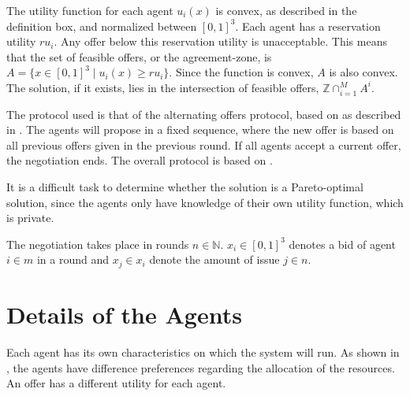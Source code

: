 The utility function for each agent $u_i(x)$ is convex, as described in the definition box, and normalized between $[0, 1]^3$. Each agent has a reservation utility $ru_i$. Any offer below this reservation utility is unacceptable. This means that the set of feasible offers, or the agreement-zone, is $A = \{ x\in [0,1]^3 \mid u_i(x)\geq ru_i\}$. Since the function is convex, $A$ is also convex. The solution, if it exists, lies in the intersection of feasible offers, $\mathbb{Z} \cap^M_{i=1}A^i$.



The protocol used is that of the alternating offers protocol, based on \citep{rubinstein1982perfect} as described in . The agents will propose in a fixed sequence, where the new offer is based on all previous offers given in the previous round. If all agents accept a current offer, the negotiation ends. The overall protocol is based on \citep{zheng2015automated}. 

It is a difficult task to determine whether the solution is a Pareto-optimal solution, since the agents only have knowledge of their own utility function, which is private. 

The negotiation takes place in rounds $n\in \mathbb{N} $. ${x}_i \in [0,1]^3$ denotes a bid of agent $i \in m$ in a round and $x_{j}\in {x}_i$  denote the amount of issue $j \in n$. 





\section{Details of the Agents}
Each agent has its own characteristics on which the system will run. As shown in , the agents have difference preferences regarding the allocation of the resources. An offer has a different utility for each agent. 

